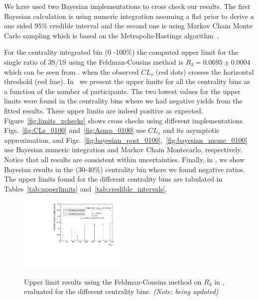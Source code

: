 We have used two Bayesian implementations to cross check our results. The first Bayesian calculation is using numeric integration assuming a flat prior to derive a one sided $95\%$ credible interval and the second one is using Markov Chain Monte Carlo sampling which is based on the Metropolis-Hastings algorithm~\cite{MCMC}. 


For the centrality integrated bin (0 -100\%) the computed upper limit for the single ratio of 3S/1S using the Feldman-Cousins method 
is $R_{3}=0.0695 \pm 0.0004$ which can be seen from . 
when the observed $CL_s$ (red dots) crosses the horizontal threshold (red line). 
In~ 
we present the upper limits for all the centrality bins as a function of the number of participants. The two lowest values for the upper limits were found in the centrality bins where we had negative yields from the fitted results. These upper limits are indeed positive as expected. 
Figure~\ref{fig:limits_xchecks} %
shows cross checks using different implementations.  
Figs.~\ref{fig:CLs_0100} and~\ref{fig:Asmp_0100} %
use $CL_{s}$ and its asymptotic  approximation, and 
Figs.~\ref{fig:bayesian_post_0100},~\ref{fig:bayesian_mcmc_0100} %
use Bayesian numeric integration and Markov Chain Montecarlo, respectively. Notice that all results are consistent within uncertainties.  
Finally, %
in ,  
 we show Bayesian results in the (30-40\%) centrality bin where we found negative ratios.
%
The upper limits found for the different centrality bins are tabulated in Tables~\ref{tab:upperlimits} and~\ref{tab:credible_intervals}. 


\begin{figure}[hbtp]
  \begin{center}
{\includegraphics[angle=0,width=0.45\textwidth]{figures/limits/FC_Centrality}\label{fig:FC_Centrality}}
   \caption{Upper limit results using the Feldman-Cousins method on $R_3$ in \PbPb, evaluated for the different centrality bins. \emph{(Note: being updated)}
}
    \label{fig:FC_Centrality}
  \end{center}
\end{figure}


